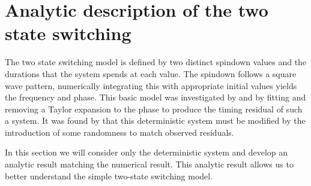 \documentclass[/home/greg/Thesis/main/main.tex]{subfiles}
\begin{document}
\graphicspath{{/home/greg/Neutron_star_modelling/LyneSwitchingAnalytic/img/}}

 \newcommand{\dST}{\Delta\fdot_{T}}
\renewcommand{\tref}{t_{\textrm{R}}}

\newcommand{\two}[2]{
\left\{
\begin{array}{cc}
#1  &t \in A \\
#2& t \in B
\end{array}•
\right.}


\section{Analytic description of the two state switching}
The two state switching model is defined by two distinct spindown values and the
durations that the system spends at each value. The spindown follows a square
wave pattern, numerically integrating this with appropriate initial values yields the
frequency and phase. This basic model was investigated by \citet{Lyne2010} and
\citet{Perrara2014} by fitting and removing a Taylor expansion to the phase to
produce the timing residual of such a system. 
It was found by \citet{Lyne2010} that this deterministic
system must be modified by the introduction of some randomness to match 
observed residuals. 

In this section we will consider only the deterministic system and develop an
analytic result matching the numerical result. This analytic result allows us
to better understand the simple two-state switching model.
\end{document}
